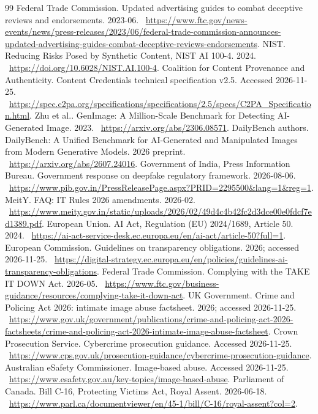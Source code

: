 \documentclass[11pt,a4paper]{article}
\begin{document}
\begin{thebibliography}{99}
 Federal Trade Commission. Updated advertising guides to combat deceptive reviews and endorsements. 2023-06. \ \url{https://www.ftc.gov/news-events/news/press-releases/2023/06/federal-trade-commission-announces-updated-advertising-guides-combat-deceptive-reviews-endorsements}.
 NIST. Reducing Risks Posed by Synthetic Content, NIST AI 100-4. 2024. \ \url{https://doi.org/10.6028/NIST.AI.100-4}.
 Coalition for Content Provenance and Authenticity. Content Credentials technical specification v2.5. Accessed 2026-11-25. \ \url{https://spec.c2pa.org/specifications/specifications/2.5/specs/C2PA_Specification.html}.
 Zhu et al.. GenImage: A Million-Scale Benchmark for Detecting AI-Generated Image. 2023. \ \url{https://arxiv.org/abs/2306.08571}.
 DailyBench authors. DailyBench: A Unified Benchmark for AI-Generated and Manipulated Images from Modern Generative Models. 2026 preprint. \ \url{https://arxiv.org/abs/2607.24016}.
 Government of India, Press Information Bureau. Government response on deepfake regulatory framework. 2026-08-06. \ \url{https://www.pib.gov.in/PressReleasePage.aspx?PRID=2295500&lang=1&reg=1}.
 MeitY. FAQ: IT Rules 2026 amendments. 2026-02. \ \url{https://www.meity.gov.in/static/uploads/2026/02/49d4c4b42fc2d3dce00e0fdcf7ed1389.pdf}.
 European Union. AI Act, Regulation (EU) 2024/1689, Article 50. 2024. \ \url{https://ai-act-service-desk.ec.europa.eu/en/ai-act/article-50?full=1}.
 European Commission. Guidelines on transparency obligations. 2026; accessed 2026-11-25. \ \url{https://digital-strategy.ec.europa.eu/en/policies/guidelines-ai-transparency-obligations}.
 Federal Trade Commission. Complying with the TAKE IT DOWN Act. 2026-05. \ \url{https://www.ftc.gov/business-guidance/resources/complying-take-it-down-act}.
 UK Government. Crime and Policing Act 2026: intimate image abuse factsheet. 2026; accessed 2026-11-25. \ \url{https://www.gov.uk/government/publications/crime-and-policing-act-2026-factsheets/crime-and-policing-act-2026-intimate-image-abuse-factsheet}.
 Crown Prosecution Service. Cybercrime prosecution guidance. Accessed 2026-11-25. \ \url{https://www.cps.gov.uk/prosecution-guidance/cybercrime-prosecution-guidance}.
 Australian eSafety Commissioner. Image-based abuse. Accessed 2026-11-25. \ \url{https://www.esafety.gov.au/key-topics/image-based-abuse}.
 Parliament of Canada. Bill C-16, Protecting Victims Act, Royal Assent. 2026-06-18. \ \url{https://www.parl.ca/documentviewer/en/45-1/bill/C-16/royal-assent?col=2}.

\end{thebibliography}
\end{document}
